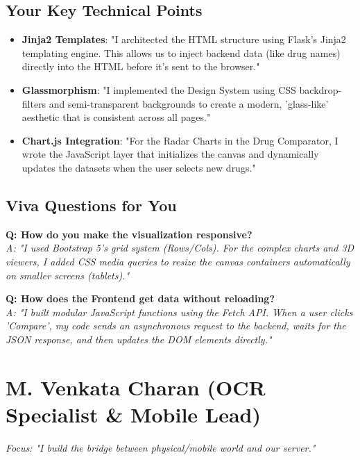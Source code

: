 \documentclass[a4paper,11pt]{report}
\begin{document}
\section{Your Key Technical Points}
\begin{itemize}
    \item \textbf{Jinja2 Templates}: "I architected the HTML structure using Flask's Jinja2 templating engine. This allows us to inject backend data (like drug names) directly into the HTML before it's sent to the browser."
    \item \textbf{Glassmorphism}: "I implemented the Design System using CSS backdrop-filters and semi-transparent backgrounds to create a modern, 'glass-like' aesthetic that is consistent across all pages."
    \item \textbf{Chart.js Integration}: "For the Radar Charts in the Drug Comparator, I wrote the JavaScript layer that initializes the canvas and dynamically updates the datasets when the user selects new drugs."
\end{itemize}

\section{Viva Questions for You}
\textbf{Q: How do you make the visualization responsive?} \\
\textit{A: "I used Bootstrap 5's grid system (Rows/Cols). For the complex charts and 3D viewers, I added CSS media queries to resize the canvas containers automatically on smaller screens (tablets)."}

\textbf{Q: How does the Frontend get data without reloading?} \\
\textit{A: "I built modular JavaScript functions using the Fetch API. When a user clicks 'Compare', my code sends an asynchronous request to the backend, waits for the JSON response, and then updates the DOM elements directly."}

\newpage

\chapter{M. Venkata Charan (OCR Specialist \& Mobile Lead)}
\textit{Focus: "I build the bridge between physical/mobile world and our server."}
\end{document}
